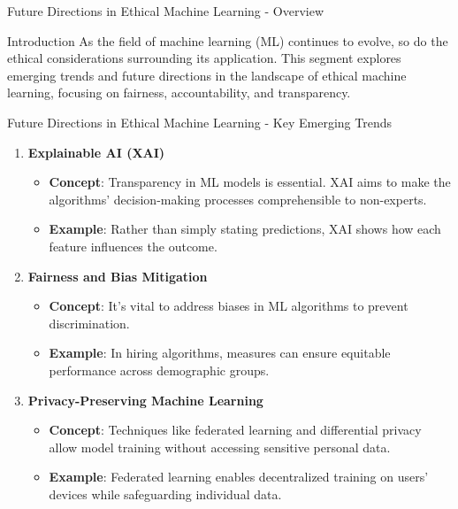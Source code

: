 \documentclass[aspectratio=169]{beamer}
\begin{document}
\begin{frame}[fragile]{Future Directions in Ethical Machine Learning - Overview}
    \begin{block}{Introduction}
        As the field of machine learning (ML) continues to evolve, so do the ethical considerations surrounding its application. 
        This segment explores emerging trends and future directions in the landscape of ethical machine learning, focusing on fairness, accountability, and transparency.
    \end{block}
\end{frame}

\begin{frame}[fragile]{Future Directions in Ethical Machine Learning - Key Emerging Trends}
    \begin{enumerate}
        \item \textbf{Explainable AI (XAI)}
            \begin{itemize}
                \item \textbf{Concept}: Transparency in ML models is essential. XAI aims to make the algorithms' decision-making processes comprehensible to non-experts.
                \item \textbf{Example}: Rather than simply stating predictions, XAI shows how each feature influences the outcome.
            \end{itemize}
        
        \item \textbf{Fairness and Bias Mitigation}
            \begin{itemize}
                \item \textbf{Concept}: It's vital to address biases in ML algorithms to prevent discrimination.
                \item \textbf{Example}: In hiring algorithms, measures can ensure equitable performance across demographic groups.
            \end{itemize}
        
        \item \textbf{Privacy-Preserving Machine Learning}
            \begin{itemize}
                \item \textbf{Concept}: Techniques like federated learning and differential privacy allow model training without accessing sensitive personal data.
                \item \textbf{Example}: Federated learning enables decentralized training on users' devices while safeguarding individual data.
            \end{itemize}
    \end{enumerate}
\end{frame}
\end{document}
